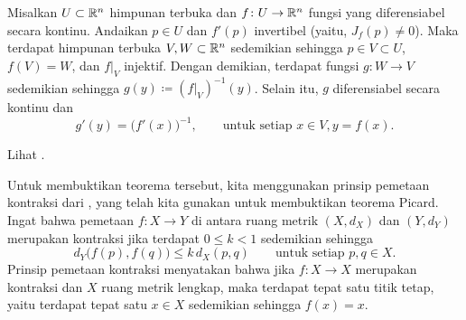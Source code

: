 \begin{thm}
\label{thm:inverse}
Misalkan $U \subset {\mathbb{R}}^n$ himpunan terbuka dan
$f \colon U \to {\mathbb{R}}^n$ fungsi yang diferensiabel secara kontinu.
Andaikan $p \in U$ dan $f'(p)$ invertibel
(yaitu, $J_f(p) \neq 0$).
Maka terdapat himpunan terbuka $V, W \subset {\mathbb{R}}^n$ sedemikian sehingga
$p \in V \subset U$, $f(V) = W$, dan $f|_V$ injektif.  
Dengan demikian, terdapat fungsi $g \colon W \to V$ sedemikian sehingga
$g(y) \coloneqq (f|_V)^{-1}(y)$.
Selain itu, $g$ diferensiabel secara kontinu
dan 
\begin{equation*}
g'(y) = {\bigl(f'(x)\bigr)}^{-1}, \qquad \text{untuk setiap } x \in V, y = f(x).
\end{equation*}
\end{thm}
Lihat .

\begin{myfigureht}
\caption{Skema teorema fungsi invers dalam $\R^n$.\label{fig:inversefuncRn}}
\end{myfigureht}

Untuk membuktikan teorema tersebut, kita menggunakan prinsip pemetaan
kontraksi dari
,
yang telah kita gunakan
untuk membuktikan teorema Picard.
Ingat bahwa pemetaan $f \colon X \to Y$ di antara ruang metrik
$(X,d_X)$ dan $(Y,d_Y)$ merupakan kontraksi 
jika terdapat $0 \leq k < 1$ sedemikian sehingga
\begin{equation*}
d_Y\bigl(f(p),f(q)\bigr) \leq k \, d_X(p,q)
\qquad \text{untuk setiap } p,q \in X.
\end{equation*}
Prinsip pemetaan kontraksi menyatakan bahwa jika $f \colon X \to X$
merupakan kontraksi dan $X$ ruang metrik lengkap,
maka terdapat tepat satu titik tetap, yaitu
terdapat tepat satu $x \in X$ sedemikian sehingga $f(x) = x$.

